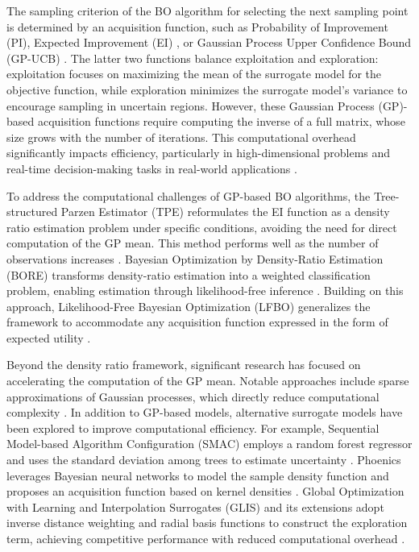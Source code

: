 \documentclass[11pt,en]{elegantpaper}
\newcommand{\1}{\mathds{1}}
\begin{document}
The sampling criterion of the BO algorithm for selecting the next sampling point is determined by an acquisition function, such as Probability of Improvement (PI), Expected Improvement (EI) \cite{mockus1998application,jones1998efficient}, or Gaussian Process Upper Confidence Bound (GP-UCB) \cite{cox1992statistical,cox1997sdo,srinivas2010gaussian}. The latter two functions balance exploitation and exploration: exploitation focuses on maximizing the mean of the surrogate model for the objective function, while exploration minimizes the surrogate model's variance to encourage sampling in uncertain regions.
However, these Gaussian Process (GP)-based acquisition functions require computing the inverse of a full matrix, whose size grows with the number of iterations. This computational overhead significantly impacts efficiency, particularly in high-dimensional problems and real-time decision-making tasks in real-world applications \cite{hase2018phoenics}.


To address the computational challenges of GP-based BO algorithms, the Tree-structured Parzen Estimator (TPE) reformulates the EI function as a density ratio estimation problem under specific conditions, avoiding the need for direct computation of the GP mean. This method performs well as the number of observations increases \cite{bergstra2011algorithms}.
Bayesian Optimization by Density-Ratio Estimation (BORE) transforms density-ratio estimation into a weighted classification problem, enabling estimation through likelihood-free inference \cite{tiao2021bore,oliveira2022batch}. Building on this approach, Likelihood-Free Bayesian Optimization (LFBO) generalizes the framework to accommodate any acquisition function expressed in the form of expected utility \cite{song2022general}.


Beyond the density ratio framework, significant research has focused on accelerating the computation of the GP mean. Notable approaches include sparse approximations of Gaussian processes, which directly reduce computational complexity \cite{liu2020gaussian,mutny2018efficient,calandriello2019gaussian,rando2022ada}.
In addition to GP-based models, alternative surrogate models have been explored to improve computational efficiency.
For example, Sequential Model-based Algorithm Configuration (SMAC) employs a random forest regressor and uses the standard deviation among trees to estimate uncertainty \cite{hutter2011sequential,hutter2012parallel}. Phoenics leverages Bayesian neural networks to model the sample density function and proposes an acquisition function based on kernel densities \cite{hase2018phoenics}.
Global Optimization with Learning and Interpolation Surrogates (GLIS) and its extensions adopt inverse distance weighting and radial basis functions to construct the exploration term, achieving competitive performance with reduced computational overhead \cite{bemporad2020global,previtali2023glisp}.
\end{document}
